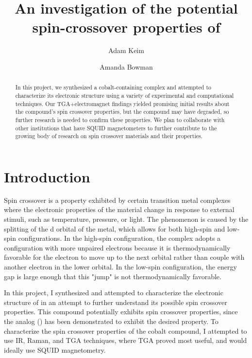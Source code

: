 \documentclass[journal=jacsat,manuscript=communication]{achemso}
\author{Adam Keim}
\author{Amanda Bowman}
\affiliation[Colorado College]{Department of Chemistry, Colorado College, Colorado Springs}
\title[An \textsf{achemso} demo]
  {An investigation of the potential spin-crossover properties of \ch{Co(phen)2(NCS)2}}
\newcommand*\compound{\ch{Co(phen)2(NCS)2} }
\begin{document}

\begin{abstract}
In this project, we synthesized a cobalt-containing complex and attempted to characterize its electronic structure using a variety of experimental and computational techniques. Our TGA+electromagnet findings yielded promising initial results about the compound's spin crossover properties, but the compound may have degraded, so further research is needed to confirm these properties. We plan to collaborate with other institutions that have SQUID magnetometers to further contribute to the growing body of research on spin crossover materials and their properties.
\end{abstract}

\section{Introduction}
Spin crossover is a property exhibited by certain transition metal complexes where the electronic properties of the material change in response to external stimuli, such as temperature, pressure, or light. The phenomenon is caused by the splitting of the d orbital of the metal, which allows for both high-spin and low-spin configurations.  In the high-spin configuration, the complex adopts a configuration with more unpaired electrons because it is thermodynamically favorable for the electron to move up to the next orbital rather than couple with another electron in the lower orbital.  In the low-spin configuration, the energy gap is large enough that this "jump" is not thermodynamically favorable.

In this project, I synthesized and attempted to characterize the electronic structure of \compound in an attempt to further understand its possible spin crossover properties.  This compound potentially exhibits spin crossover properties, since the  analog () has been demonstrated to exhibit the desired property.  To characterize the spin crossover properties of the cobalt compound, I attempted to use IR, Raman, and TGA techniques, where TGA proved most useful, and would ideally use SQUID magnetometry.  
\end{document}
